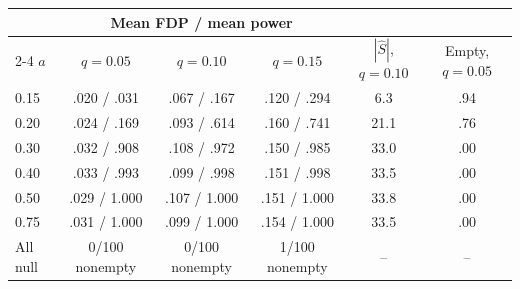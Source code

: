 \begin{tabular}{lccccc}
\toprule
& \multicolumn{3}{c}{Mean FDP / mean power} & & \\\cmidrule(lr){2-4}
$a$ & $q=0.05$ & $q=0.10$ & $q=0.15$ & $|\widehat S|$, $q=0.10$ & Empty, $q=0.05$\\\midrule
0.15 & .020 / .031 & .067 / .167 & .120 / .294 & 6.3 & .94\\
0.20 & .024 / .169 & .093 / .614 & .160 / .741 & 21.1 & .76\\
0.30 & .032 / .908 & .108 / .972 & .150 / .985 & 33.0 & .00\\
0.40 & .033 / .993 & .099 / .998 & .151 / .998 & 33.5 & .00\\
0.50 & .029 / 1.000 & .107 / 1.000 & .151 / 1.000 & 33.8 & .00\\
0.75 & .031 / 1.000 & .099 / 1.000 & .154 / 1.000 & 33.5 & .00\\
\midrule
All null & 0/100 nonempty & 0/100 nonempty & 1/100 nonempty & -- & --\\
\bottomrule
\end{tabular}

